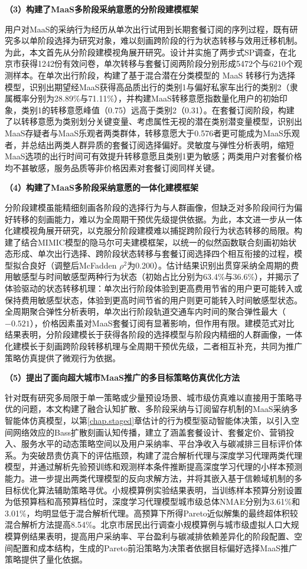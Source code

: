 \textbf{（3）构建了MaaS多阶段采纳意愿的分阶段建模框架}

用户对MaaS的采纳行为经历从单次出行试用到长期套餐订阅的序列过程，既有研究多以单阶段选择为研究对象，难以刻画跨阶段的行为状态转移与效用迁移机制。为此，本文首先从分阶段建模视角展开研究。设计并实施了两步式SP调查，在北京市获得1242份有效问卷，单次转移与套餐订阅两阶段分别形成5472个与6210个观测样本。在单次出行阶段，构建了基于混合潜在分类模型的 MaaS 转移行为选择模型，识别出期望经MaaS获得高品质出行的类别1与偏好私家车出行的类别2（隶属概率分别为28.89\%与71.11\%），并构建MaaS转移意愿指数量化用户的初始印象，类别1的转移意愿峰值（0.75）远高于类别2（0.31）。在套餐订阅阶段，构建了以转移意愿为类别划分关键变量、考虑属性无视的潜在类别潜变量模型，识别出MaaS存疑者与MaaS乐观者两类群体，转移意愿大于0.576者更可能成为MaaS乐观者，并总结出两类人群异质的套餐订阅选择偏好。灵敏度与弹性分析表明，缩短MaaS选项的出行时间可有效提升转移意愿且类别1更为敏感；两类用户对套餐价格均不甚敏感，服务品质等非价格因素对套餐订阅同样关键。

\textbf{（4）构建了MaaS多阶段采纳意愿的一体化建模框架}

分阶段建模虽能精细刻画各阶段的选择行为与人群画像，但缺乏对多阶段间行为偏好转移的刻画能力，难以为全周期干预优先级提供依据。为此，本文进一步从一体化建模视角展开研究，以克服分阶段建模难以捕捉跨阶段行为状态转移的局限。构建了结合MIMIC模型的隐马尔可夫建模框架，以统一的似然函数联合刻画初始状态形成、单次出行选择、跨阶段状态转移与套餐订阅选择四个相互衔接的过程，模型拟合良好（调整后McFadden $\rho^2$为0.200）。估计结果识别出贯穿采纳全周期的费用敏感型与时间敏感型两种行为状态（初始占比分别为63.4\%与36.6\%），并揭示了体验驱动的状态转移机理：单次出行阶段体验到更高费用节省的用户更可能转入或保持费用敏感型状态，体验到更高时间节省的用户则更可能转入时间敏感型状态。全周期聚合弹性分析表明，单次出行阶段轨道交通车内时间的聚合弹性最大（$-0.521$），价格因素虽对MaaS套餐订阅有显著影响，但作用有限。建模范式对比结果表明，分阶段建模长于获得各阶段的选择模型与阶段内精细的人群画像，一体化建模长于刻画跨阶段转移机理与全周期干预优先级，二者相互补充，共同为推广策略仿真提供了微观行为依据。

\textbf{（5）提出了面向超大城市MaaS推广的多目标策略仿真优化方法}

针对既有研究多局限于单一策略或少量预设场景、城市级仿真难以直接用于策略寻优的问题，本文构建了融合认知扩散、多阶段采纳与订阅留存机制的MaaS采纳多智能体仿真模型，以第\ref{chap.staged}章估计的行为模型驱动智能体决策，以引入空间网络效应的Bass扩散刻画认知传播，建立了涵盖套餐设计、套餐定价、营销投入、服务水平的动态策略空间以及用户采纳率、平台净收入与碳减排三目标评价体系。为突破昂贵仿真下的评估瓶颈，构建了混合解析代理与深度学习代理两类代理模型，并通过解析先验预训练和观测样本条件推断提高深度学习代理的小样本预测能力。进一步提出两类代理模型的反向求解方法，并将其嵌入基于信赖域机制的多目标优化算法辅助策略寻优。小规模算例实验结果表明，当训练样本预算分别设置为低预算档和高预算档位时，深度学习代理模型城市级总体NMAE分别为3.61\%和3.01\%，均明显低于混合解析代理。高预算下所得Pareto近似解集的最终超体积较混合解析方法提高8.54\%。北京市居民出行调查小规模算例与城市级虚拟人口大规模算例结果表明，提高用户采纳率、平台盈利与碳减排依赖差异化的阶段配置、空间配置和成本结构，生成的Pareto前沿策略为决策者依据目标偏好选择MaaS推广策略提供了量化依据。


